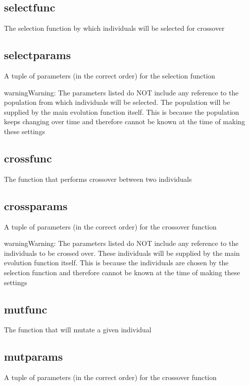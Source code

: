 \documentclass[letterpaper,10pt,english]{sphinxmanual}
\begin{document}
\subsection{selectfunc}
\label{settings.py:selectfunc}
The selection function by which individuals will be selected for crossover


\subsection{selectparams}
\label{settings.py:selectparams}
A tuple of parameters (in the correct order) for the selection function

\begin{notice}{warning}{Warning:}
The parameters listed do NOT include any reference to the population from which individuals will be selected. The population will be supplied by the main evolution function itself. This is because the population keeps changing over time and therefore cannot be known at the time of making these settings
\end{notice}


\subsection{crossfunc}
\label{settings.py:crossfunc}
The function that performs crossover between two individuals


\subsection{crossparams}
\label{settings.py:crossparams}
A tuple of parameters (in the correct order) for the crossover function

\begin{notice}{warning}{Warning:}
The parameters listed do NOT include any reference to the individuals to be crossed over. These individuals will be supplied by the main evolution function itself. This is because the individuals are chosen by the selection function and therefore cannot be known at the time of making these settings
\end{notice}


\subsection{mutfunc}
\label{settings.py:mutfunc}
The function that will mutate a given individual


\subsection{mutparams}
\label{settings.py:mutparams}
A tuple of parameters (in the correct order) for the crossover function
\end{document}
